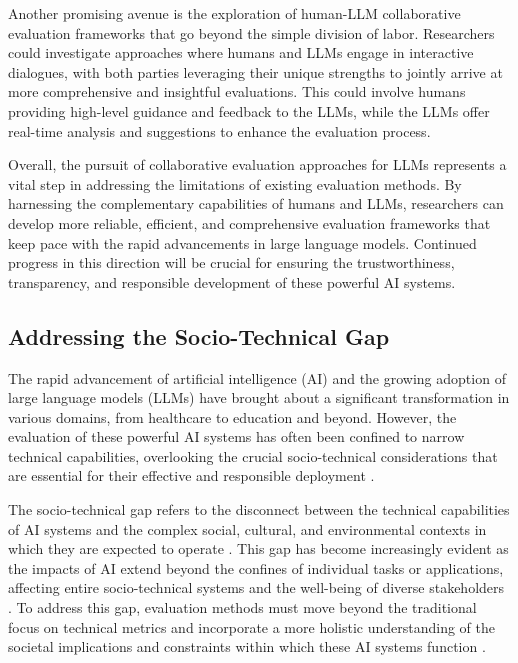 \documentclass[11pt]{article}
\begin{document}
Another promising avenue is the exploration of human-LLM collaborative evaluation frameworks that go beyond the simple division of labor. Researchers could investigate approaches where humans and LLMs engage in interactive dialogues, with both parties leveraging their unique strengths to jointly arrive at more comprehensive and insightful evaluations. This could involve humans providing high-level guidance and feedback to the LLMs, while the LLMs offer real-time analysis and suggestions to enhance the evaluation process.

Overall, the pursuit of collaborative evaluation approaches for LLMs represents a vital step in addressing the limitations of existing evaluation methods. By harnessing the complementary capabilities of humans and LLMs, researchers can develop more reliable, efficient, and comprehensive evaluation frameworks that keep pace with the rapid advancements in large language models. Continued progress in this direction will be crucial for ensuring the trustworthiness, transparency, and responsible development of these powerful AI systems.

\subsection{Addressing the Socio-Technical Gap}

The rapid advancement of artificial intelligence (AI) and the growing adoption of large language models (LLMs) have brought about a significant transformation in various domains, from healthcare to education and beyond. However, the evaluation of these powerful AI systems has often been confined to narrow technical capabilities, overlooking the crucial socio-technical considerations that are essential for their effective and responsible deployment \cite{ref64,ref355}.

The socio-technical gap refers to the disconnect between the technical capabilities of AI systems and the complex social, cultural, and environmental contexts in which they are expected to operate \cite{ref356}. This gap has become increasingly evident as the impacts of AI extend beyond the confines of individual tasks or applications, affecting entire socio-technical systems and the well-being of diverse stakeholders \cite{ref357}. To address this gap, evaluation methods must move beyond the traditional focus on technical metrics and incorporate a more holistic understanding of the societal implications and constraints within which these AI systems function \cite{ref358}.
\end{document}
